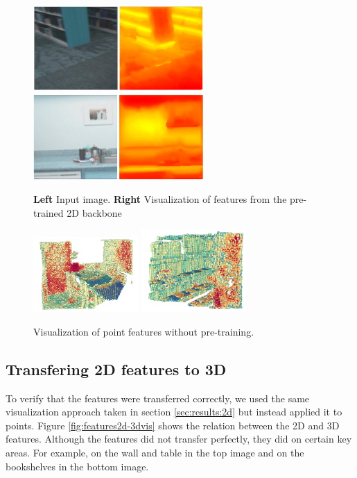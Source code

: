 \documentclass[10pt,twocolumn,letterpaper]{article}
\begin{document}
\begin{figure}
    \centering
    \includegraphics[width=6.5cm]{images/experiments/25.02.2022-image-pretrain-vis2.png}
    \includegraphics[width=6.5cm]{images/experiments/25.02.2022-image-pretrain-vis1.png}
    \caption{\textbf{Left} Input image. \textbf{Right} Visualization of features from the pre-trained 2D backbone}
    \label{fig:features2dvis}
\end{figure}

\begin{figure}
    \centering
    \includegraphics[width=4cm]{images/experiments/scratch-3d.png}
    \includegraphics[width=4cm]{images/experiments/scratch-3d-2.png}
    \caption{Visualization of point features without pre-training.}
    \label{fig:features2dScratchvis}
\end{figure}

\subsection{Transfering 2D features to 3D}
\label{sec:results:2d3d}

To verify that the features were transferred correctly, we used the same visualization approach taken in section \ref{sec:results:2d} but instead applied it to points. Figure \ref{fig:features2d-3dvis} shows the relation between the 2D and 3D features. Although the features did not transfer perfectly, they did on certain key areas. For example, on the wall and table in the top image and on the bookshelves in the bottom image.
\end{document}
